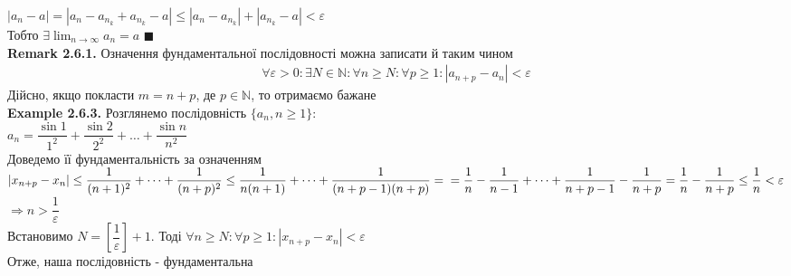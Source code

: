 \documentclass[a4paper, 14pt]{extarticle}
\def\huge{\displaystyle}
\def\bigline{\vspace{5mm}\\}
\def\ex#1{\textbf{Example {#1}}}
\def\rm#1{\textbf{Remark {#1}}}
\def\bigline{\vspace{5mm}\\}
\def\qed{$\blacksquare$}
\begin{document}
	$|a_n - a| = |a_n - a_{n_k} + a_{n_k} - a| \leq |a_n - a_{n_k}| + |a_{n_k} - a| < \varepsilon$\\
	Тобто $\huge \exists \lim_{n \to \infty} a_n = a$ \qed
	\bigline
	\rm{2.6.1.} Означення фундаментальної послідовності можна записати й таким чином
	\begin{align*}
	\forall \varepsilon > 0: \exists N \in \mathbb{N}: \forall n \geq N: \forall p \geq 1: |a_{n+p} - a_n| < \varepsilon
	\end{align*}
	Дійсно, якщо покласти $m = n + p$, де $p \in \mathbb{N}$, то отримаємо бажане
	\bigline
	\ex{2.6.3.} Розглянемо послідовність $\{a_n, n \geq 1\}:$\\
	$a_n = \dfrac{\sin 1}{1^2} + \dfrac{\sin 2}{2^2} + \dots + \dfrac{\sin n}{n^2}$\\
	Доведемо її фундаментальність за означенням\\
	$|x_{n+p} - x_n| \leq \dfrac{1}{(n+1)^2} + \dots + \dfrac{1}{(n+p)^2} \leq \dfrac{1}{n(n+1)} + \dots + \dfrac{1}{(n+p-1)(n+p)} = \\ = \dfrac{1}{n} - \dfrac{1}{n-1} + \dots + \dfrac{1}{n+p-1} - \dfrac{1}{n+p} = \dfrac{1}{n} - \dfrac{1}{n+p} \leq \dfrac{1}{n} < \varepsilon$\\
	$\Rightarrow n > \dfrac{1}{\varepsilon}$\\
	Встановимо $N = \left[ \dfrac{1}{\varepsilon} \right] + 1$. Тоді $\forall n \geq N: \forall p \geq 1: |x_{n+p} - x_n| < \varepsilon$\\
	Отже, наша послідовність - фундаментальна
	\newpage
\end{document}
